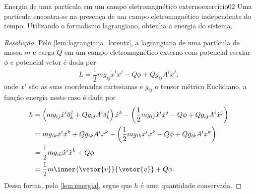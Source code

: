 \begin{exercício}{Energia de uma partícula em um campo eletromagnético externo}{exercício02}
    Uma partícula encontra-se na presença de um campo eletromagnético independente do tempo. Utilizando o formalismo lagrangiano, obtenha a energia do sistema.
\end{exercício}
\begin{proof}[Resolução]
    Pelo \cref{lem:lagrangiana_lorentz}, a lagrangiana de uma partícula de massa \(m\) e carga \(Q\) em um campo eletromagnético externo com potencial escalar \(\phi\) e potencial vetor  é dada por
    \begin{equation*}
        L = \frac12 m g_{ij} \dot{x}^i \dot{x}^j - Q\phi + Q g_{ij} A^i \dot{x}^j,
    \end{equation*}
    onde \(x^i\) são as suas coordenadas cartesianas e \(g_{ij}\) o tensor métrico Euclidiano, a função energia neste caso é dada por
    \begin{align*}
        h &= \left(mg_{ij} \dot{x}^i \delta^j_k + Q g_{ij} A^i \delta^j_k\right)\dot{x}^k - \left( \frac12 m g_{ij} \dot{x}^i \dot{x}^j - Q\phi +Q g_{ij} A^i \dot{x}^j\right)\\
          &= m g_{ik}\dot{x}^i \dot{x}^k + Qg_{ik}A^i\dot{x}^k - \left(\frac12 m g_{ik} \dot{x}^i \dot{x}^k - Q\phi + Qg_{ik} A^i \dot{x}^k\right)\\
          &= \frac12 m g_{ik} \dot{x}^i\dot{x}^k + Q\phi\\
          &= \frac12 m \inner{\vetor{v}}{\vetor{v}} + Q\phi.
    \end{align*}
     Dessa forma, pelo \cref{lem:energia}, segue que \(h\) é uma quantidade conservada.
\end{proof}

